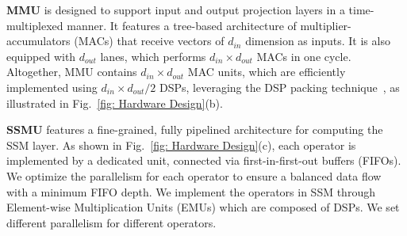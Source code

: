 \textbf{MMU}
is designed to support input and output projection layers in a time-multiplexed manner.
It features a tree-based architecture of multiplier-accumulators (MACs) that receive vectors of $d_{in}$ dimension as inputs. 
It is also equipped with $d_{out}$ lanes, which performs $d_{in} \times d_{out}$ MACs in one cycle. Altogether, MMU contains $d_{in} \times d_{out}$ MAC units, which are efficiently implemented using ${d_{in} \times d_{out}}/2$ DSPs, leveraging the DSP packing technique~\cite{pack}, as illustrated in Fig.~\ref{fig: Hardware Design}(b).




\textbf{SSMU}
features a fine-grained, fully pipelined architecture 
for computing the SSM layer.
As shown in Fig.~\ref{fig: Hardware Design}(c), 
each operator is implemented by a dedicated unit, connected via first-in-first-out buffers (FIFOs). 
We optimize the parallelism for each operator to ensure a balanced data flow with a minimum FIFO depth.
We implement the operators in SSM through Element-wise Multiplication Units (EMUs) which are composed of DSPs. 
We set different parallelism for different operators. 


